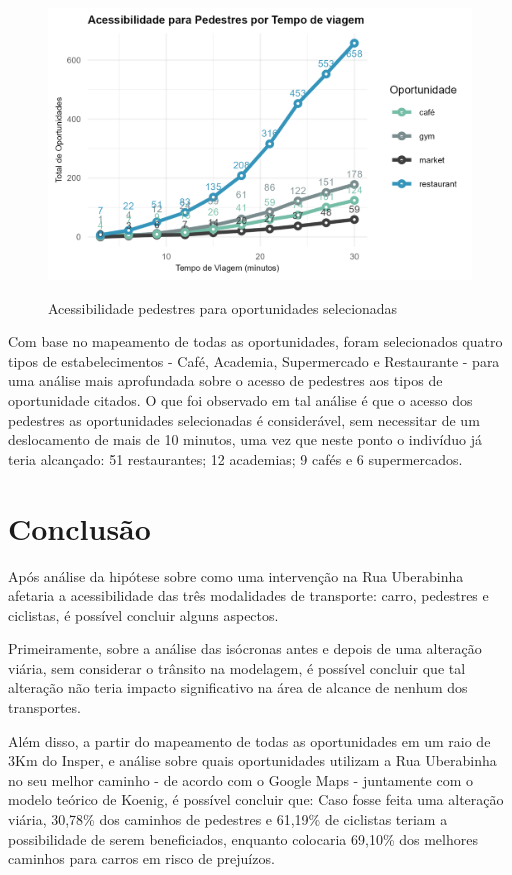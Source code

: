 \begin{figure}[H]
    \centering
    \caption{Acessibilidade pedestres para oportunidades selecionadas}
    \includegraphics[width = 0.8\linewidth]{relatorios/uberabinha/figuras/acessibilidade_pedestres.png}
    \label{fig:acessibilidade_pedestre}
\end{figure}

Com base no mapeamento de todas as oportunidades, foram selecionados quatro tipos de estabelecimentos - Café, Academia, Supermercado e Restaurante - para uma análise mais aprofundada sobre o acesso de pedestres aos tipos de oportunidade citados. O que foi observado em tal análise é que o acesso dos pedestres as oportunidades selecionadas é considerável, sem necessitar de um deslocamento de mais de 10 minutos, uma vez que neste ponto o indivíduo já teria alcançado: 51 restaurantes; 12 academias; 9 cafés e 6 supermercados.

\section{Conclusão}
Após análise da hipótese sobre como uma intervenção na Rua Uberabinha afetaria a acessibilidade das três modalidades de transporte: carro, pedestres e ciclistas, é possível concluir alguns aspectos.

Primeiramente, sobre a análise das isócronas antes e depois de uma alteração viária, sem considerar o trânsito na modelagem, é possível concluir que tal alteração não teria impacto significativo na área de alcance de nenhum dos transportes.

Além disso, a partir do mapeamento de todas as oportunidades em um raio de 3Km do Insper, e análise sobre quais oportunidades utilizam a Rua Uberabinha no seu melhor caminho - de acordo com o Google Maps - juntamente com o modelo teórico de Koenig, é possível concluir que: Caso fosse feita uma alteração viária, 30,78\% dos caminhos de pedestres e 61,19\% de ciclistas teriam a possibilidade de serem beneficiados, enquanto colocaria 69,10\% dos melhores caminhos para carros em risco de prejuízos.

